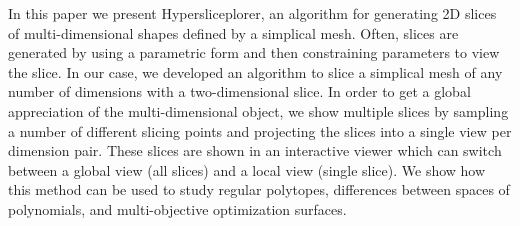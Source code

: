 In this paper we present Hypersliceplorer, an algorithm for generating 2D
slices of multi-dimensional shapes defined by a simplical mesh.  Often, slices
are generated by using a parametric form and then constraining parameters to
view the slice. In our case, we developed an algorithm to slice a simplical
mesh of any number of dimensions with a two-dimensional slice.  In order to get
a global appreciation of the multi-dimensional object, we show multiple slices
by sampling a number of different slicing points and projecting the slices into
a single view per dimension pair. These slices are shown in an interactive
viewer which can switch between a global view (all slices) and a local view
(single slice). We show how this method can be used to study regular polytopes,
differences between spaces of polynomials, and multi-objective optimization
surfaces. 


